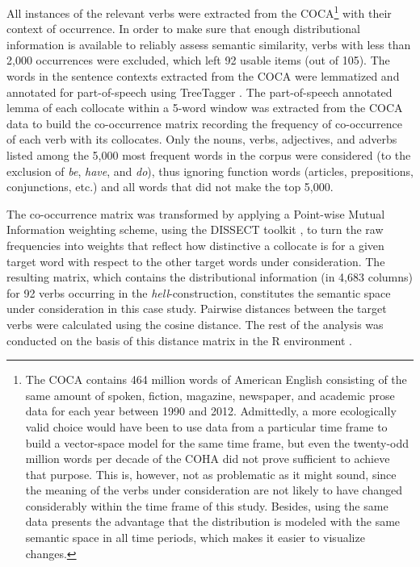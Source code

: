 \documentclass[11pt]{article}
\begin{document}
All instances of the relevant verbs were extracted from the COCA\footnote{The COCA contains 464 million words of American English consisting of the same amount of spoken, fiction, magazine, newspaper, and academic prose data for each year between 1990 and 2012. Admittedly, a more ecologically valid choice would have been to use data from a particular time frame to build a vector-space model for the same time frame, but even the twenty-odd million words per decade of the COHA did not prove sufficient to achieve that purpose. This is, however, not as problematic as it might sound, since the meaning of the verbs under consideration are not likely to have changed considerably within the time frame of this study. Besides, using the same data presents the advantage that the distribution is modeled with the same semantic space in all time periods, which makes it easier to visualize changes.} with their context of occurrence. In order to make sure that enough distributional information is available to reliably assess semantic similarity, verbs with less than 2,000 occurrences were excluded, which left 92 usable items (out of 105). The words in the sentence contexts extracted from the COCA were lemmatized and annotated for part-of-speech using TreeTagger \cite{Schmid1994}. The part-of-speech annotated lemma of each collocate within a 5-word window was extracted from the COCA data to build the co-occurrence matrix recording the frequency of co-occurrence of each verb with its collocates. Only the nouns, verbs, adjectives, and adverbs listed among the 5,000 most frequent words in the corpus were considered (to the exclusion of \textit{be}, \textit{have}, and \textit{do}), thus ignoring function words (articles, prepositions, conjunctions, etc.) and all words that did not make the top 5,000.

The co-occurrence matrix was transformed by applying a Point-wise Mutual Information weighting scheme, using the DISSECT toolkit \cite{DinuEtAl2013}, to turn the raw frequencies into weights that reflect how distinctive a collocate is for a given target word with respect to the other target words under consideration. The resulting matrix, which contains the distributional information (in 4,683 columns) for 92 verbs occurring in the \textit{hell}-construction, constitutes the semantic space under consideration in this case study. Pairwise distances between the target verbs were calculated using the cosine distance. The rest of the analysis was conducted on the basis of this distance matrix in the R environment \cite{R2013}.
\end{document}
